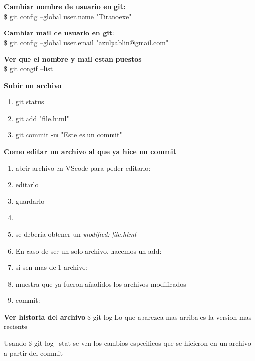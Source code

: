 \documentclass[]{article} %
\begin{document}
\begin{center}

	\textbf{Cambiar nombre de usuario en git:}\\
	\$ git config --global user.name "Tiranoexe"

	\textbf{Cambiar mail de usuario en git:}\\
	\$ git config --global user.email "azulpablin@gmail.com"

	\textbf{Ver que el nombre y mail estan puestos}\\
	\$ git congif --list


	\textbf{Subir un archivo}\\
  \begin{enumerate}
    \item git status
    \item git add "file.html"
    \item git commit -m "Este es un commit"
	
  \end{enumerate}
	
	\textbf{Como editar un archivo al que ya hice un commit}
  \begin{enumerate}
    \item abrir archivo en VScode para poder editarlo:
    \item editarlo
    \item guardarlo
    \item {}
    \item se deberia obtener un \textit{modified: file.html}
    \item En caso de ser un solo archivo, hacemos un add: 
    \item si son mas de 1 archivo: 
    \item {} muestra que ya fueron añadidos los archivos modificados 
    \item commit: 
	
  \end{enumerate}

	\textbf{Ver historia del archivo}
	\$ git log
	Lo que aparezca mas arriba es la version mas reciente

	Usando \$ git log --stat se ven los cambios especificos que se hicieron en un archivo a partir del commit


\end{center}
\end{document}
